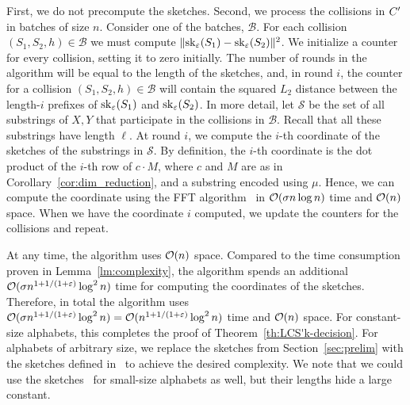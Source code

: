 First, we do not precompute the sketches. Second, we process the collisions in $C'$ in batches of size $n$. Consider one of the batches, $\mathcal{B}$. For each collision $(S_1,S_2, h) \in \mathcal{B}$ we must compute $\lVert\mathrm{sk}_\varepsilon(S_1) - \mathrm{sk}_\varepsilon(S_2)\rVert^2$. 
We initialize a counter for every collision, setting it to zero initially. The number of rounds in the algorithm will be equal to the length of the sketches, and, in round $i$, the counter for a collision $(S_1, S_2, h) \in \mathcal{B}$ will contain the squared $L_2$ distance between the length-$i$ prefixes of $\mathrm{sk}_\varepsilon(S_1)$ and $\mathrm{sk}_\varepsilon(S_2)$. In more detail, let $\mathcal{S}$ be the set of all substrings of $X, Y$ that participate in the collisions in $\mathcal{B}$. Recall that all these substrings have length $\ell$. At round $i$, we compute the $i$-th coordinate of the sketches of the substrings in $\mathcal{S}$. By definition, the $i$-th coordinate is the dot product of the $i$-th row of $c \cdot M$, where $c$ and $M$ are as in Corollary~\ref{cor:dim_reduction}, and a substring encoded using $\mu$. Hence, we can compute the coordinate using the FFT algorithm~\cite{FischerPaterson} in $\mathcal{O}(\sigma n \log n)$ time and $\mathcal{O}(n)$ space. When we have the coordinate $i$ computed, we update the counters for the collisions and repeat.

At any time, the algorithm uses $\mathcal{O}(n)$ space.
Compared to the time consumption proven in Lemma~\ref{lm:complexity}, the algorithm spends an additional $\mathcal{O}(\sigma n^{1+1/(1+\varepsilon)} \log^2 n)$ time for computing the coordinates of the sketches.
Therefore, in total the algorithm uses $\mathcal{O}(\sigma n^{1+1/(1+\varepsilon)} \log^2 n) = \mathcal{O}(n^{1+1/(1+\varepsilon)} \log^2 n)$ time and $\mathcal{O}(n)$ space. 
For constant-size alphabets, this completes the proof of Theorem~\ref{th:LCS'k-decision}. For alphabets of arbitrary size, we replace the sketches from Section~\ref{sec:prelim} with the sketches defined in~\cite{DBLP:journals/algorithmica/KociumakaRS19} to achieve the desired complexity.
We note that we could use the sketches~\cite{DBLP:journals/algorithmica/KociumakaRS19} for small-size alphabets as well, but their lengths hide a large constant. 



